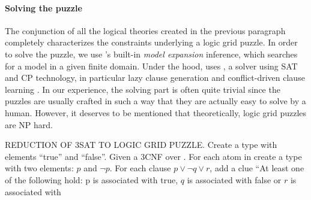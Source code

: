 

\paragraph{Solving the puzzle}
The conjunction of all the logical theories created in the previous paragraph completely characterizes the constraints underlying a logic grid puzzle.
In order to solve the puzzle, we use \idp's built-in \emph{model expansion} inference, which searches for a model in a given finite domain. Under the hood, \idp uses \minisatid {}, a solver using SAT  and CP  technology, in particular lazy clause generation  and conflict-driven clause learning . In our experience, the solving part is often quite trivial since the puzzles are usually crafted in such a way that they are actually easy to solve by a human. However, it deserves to be mentioned that theoretically, logic grid puzzles are NP hard.


REDUCTION OF 3SAT TO LOGIC GRID PUZZLE. 
Create a type with elements ``true'' and ``false''. 
Given a 3CNF over \voc. For each atom in \voc create a type with two elements: $p$ and $\lnot p$.
For each clause $p \lor \lnot q \lor r$, add a clue 
``At least one of the following hold: p is associated with true, $q$ is associated with false or $r$ is associated with 




